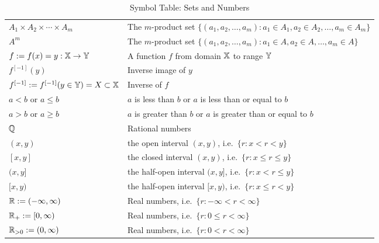 {\begin{table}[htb]
{\begin{tabular}{| l | l |}
$A_1 \times A_2 \times \cdots \times A_m$ & The $m$-product set $\{(a_1,a_2,\ldots,a_{m}): a_1 \in A_1, a_2 \in A_2, \ldots, a_{m} \in A_m \}$ \\
$A^m$ & The $m$-product set $\{(a_1,a_2,\ldots,a_{m}): a_1 \in A, a_2 \in A, \ldots, a_{m} \in A \}$ \\ 
$f := f(x)=y:\mathbb{X} \to \mathbb{Y}$ & A function $f$ from domain $\mathbb{X}$ to range $\mathbb{Y}$ \\
$f^{[-1]}(y)$ & Inverse image of $y$ \\ 
$f^{[-1]} := f^{[-1]}(y \in \mathbb{Y}) = X \subset \mathbb{X}$ & Inverse of $f$ \\ 
$a<b$ or $a \leq b$ & $a$ is less than $b$ or $a$ is less than or equal to $b$ \\
$a>b$ or $a \geq b$ & $a$ is greater than $b$ or $a$ is greater than or equal to $b$ \\ 
$\mathbb{Q}$ & Rational numbers \\ 
$(x,y)$ & the open interval $(x,y)$, i.e.~$\{r: x < r < y\}$ \\ 
$[x,y]$ & the closed interval $(x,y)$, i.e.~$\{r: x \leq r \leq y\}$ \\ 
$(x,y]$ & the half-open interval $(x,y]$, i.e.~$\{r: x < r \leq y\}$ \\ 
$[x,y)$ & the half-open interval $[x,y)$, i.e.~$\{r: x \leq r < y\}$ \\ 
$\mathbb{R} := (-\infty,\infty)$ & Real numbers, i.e.~$\{r: -\infty < r <  \infty \}$ \\
$\mathbb{R}_+ := [0,\infty)$ & Real numbers, i.e.~$\{r: 0 \leq r <  \infty \}$ \\
$\mathbb{R}_{>0} := (0,\infty)$ & Real numbers, i.e.~$\{r: 0 < r <  \infty \}$ \\
\hline
\end{tabular}
}
\caption{Symbol Table: Sets and Numbers \label{T:SymbTableSets}}
\end{table}


}
